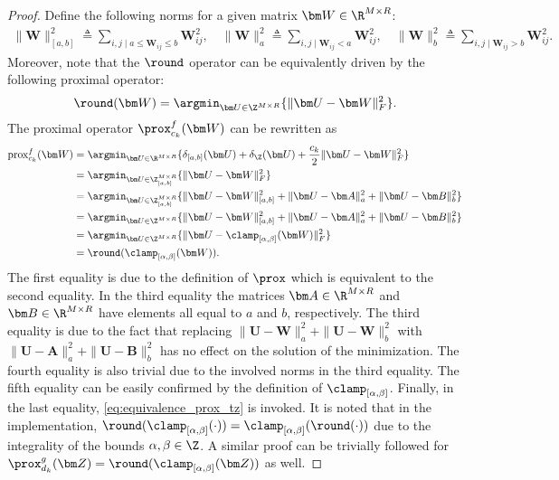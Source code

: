 \begin{proof}
    Define the following norms for a given matrix $\bm W \in \R^{M\times R}$:
    \begin{align*}
         \|\bm W\|_{[a,b]}^2 \triangleq \sum_{i,j \mid a \leq \bm W_{ij} \leq b} \bm W_{ij}^2, \quad
        \|\bm W\|_a^2 \triangleq \sum_{i,j \mid \bm W_{ij} < a} \bm W_{ij}^2, \quad                         
         \|\bm W\|_b^2 \triangleq \sum_{i,j \mid \bm W_{ij} > b} \bm W_{ij}^2.
    \end{align*}
    Moreover, note that the $\round$ operator  can be equivalently driven by the following proximal operator:
    \begin{equation}
        \round(\bm W) = \argmin_{\bm U \in \Z^{M\times R}}\{\|\bm U - \bm W\|^2_F\}.
        \label{eq:equivalence_prox_tz}
    \end{equation}
    The proximal operator $\prox^f_{c_k}(\bm W)$ can be rewritten as
    \begin{align*}
        {\rm{pr}} {\rm{ox}}^f_{c_k}(\bm W) &= \argmin_{\bm U \in \R^{M\times R}}\{\delta_{[a,b]}(\bm U) + \delta_{\Z}(\bm U) + \frac{c_k}{2} \|\bm U - \bm W\|^2_F\} \\
                & = \argmin_{\bm U \in \Z_{[a,b]}^{M\times R}}\{\|\bm U - \bm W\|^2_F\}                                                                             \\
                & = \argmin_{\bm U \in \Z_{[a,b]}^{M\times R}}\{\|\bm U - \bm W\|^2_{[a,b]} + \|\bm U - \bm A\|^2_a + \|\bm U - \bm B\|^2_b\}                       \\
                & = \argmin_{\bm U \in \Z^{M\times R}}\{\|\bm U - \bm W\|^2_{[a,b]} + \|\bm U - \bm A\|^2_a + \|\bm U - \bm B\|^2_b\}                               \\
                & = \argmin_{\bm U \in \Z^{M\times R}}\{\|\bm U - \clamp_{[\alpha,\beta]}(\bm W)\|^2_F\}                                                            \\
                & = \round(\clamp_{[\alpha,\beta]}(\bm W)).
    \end{align*}
    The first equality is due to the definition of $\prox$ which is equivalent to the second equality.
    In the third equality the matrices $\bm A\in\R^{M\times R}$ and $\bm B\in\R^{M\times R}$ have elements all equal to $a$ and $b$, respectively.
    The third equality is due to the fact that replacing $\|\bm U - \bm W\|^2_a + \|\bm U - \bm W\|^2_b$ with $\|\bm U - \bm A\|^2_a + \|\bm U - \bm B\|^2_b$ has no effect on the solution of the minimization. The fourth equality is also trivial due to the involved norms in the third equality. The fifth equality can be easily confirmed by the definition of $\clamp_{[\alpha,\beta]}$.
    Finally, in the last equality, \eqref{eq:equivalence_prox_tz} is invoked.
    It is noted that in the implementation, $\round(\clamp_{[\alpha,\beta]}(\cdot)) = \clamp_{[\alpha,\beta]}(\round(\cdot))$ due to the integrality of the bounds $\alpha,\beta \in \Z$. A similar proof can be trivially followed for $\prox^g_{d_k}(\bm Z) = \round(\clamp_{[\alpha,\beta]}(\bm Z))$ as well.
\end{proof}
